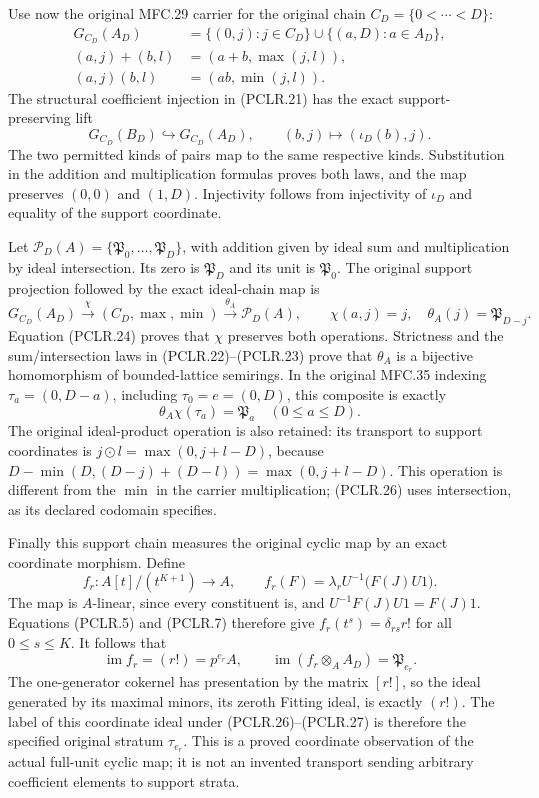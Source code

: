Use now the original MFC.29 carrier for the original chain
\(C_D=\{0<\cdots<D\}\):
\[
 \begin{split}
 G_{C_D}(A_D)&=\{(0,j):j\in C_D\}
                      \cup\{(a,D):a\in A_D\},\\
 (a,j)+(b,l)&=(a+b,\max(j,l)),\\
 (a,j)(b,l)&=(ab,\min(j,l)).
 \end{split}
 \tag{PCLR.24}
\]
The structural coefficient injection in (PCLR.21) has the exact
support-preserving lift
\[
 G_{C_D}(B_D)\hookrightarrow G_{C_D}(A_D),
       \qquad (b,j)\longmapsto(\iota_D(b),j).
 \tag{PCLR.25}
\]
The two permitted kinds of pairs map to the same respective
kinds. Substitution in the addition and multiplication formulas
proves both laws, and the map preserves \((0,0)\) and \((1,D)\).
Injectivity follows from injectivity of \(\iota_D\) and equality
of the support coordinate.

Let \(\mathcal P_D(A)=\{\mathfrak P_0,\ldots,
\mathfrak P_D\}\), with addition given by ideal sum and
multiplication by ideal intersection. Its zero is
\(\mathfrak P_D\) and its unit is \(\mathfrak P_0\). The original
support projection followed by the exact ideal-chain map is
\[
 G_{C_D}(A_D)\xrightarrow{\chi}(C_D,\max,\min)
    \xrightarrow{\theta_A}\mathcal P_D(A),\qquad
 \chi(a,j)=j,\quad\theta_A(j)=\mathfrak P_{D-j}.
 \tag{PCLR.26}
\]
Equation (PCLR.24) proves that \(\chi\) preserves both
operations. Strictness and the sum/intersection laws in
(PCLR.22)--(PCLR.23) prove that \(\theta_A\) is a bijective
homomorphism of bounded-lattice semirings. In the original
MFC.35 indexing \(\tau_a=(0,D-a)\), including
\(\tau_0=e=(0,D)\), this composite is exactly
\[
 \theta_A\chi(\tau_a)=\mathfrak P_a\quad(0\leq a\leq D).
 \tag{PCLR.27}
\]
The original ideal-product operation is also retained: its
transport to support coordinates is
\(j\mathbin{\odot}l=\max(0,j+l-D)\), because
\(D-\min(D,(D-j)+(D-l))=\max(0,j+l-D)\).
This operation is different from the \(\min\) in the carrier
multiplication; (PCLR.26) uses intersection, as its declared
codomain specifies.

Finally this support chain measures the original cyclic map by
an exact coordinate morphism. Define
\[
 f_r:A[t]/(t^{K+1})\longrightarrow A,\qquad
 f_r(F)=\lambda_rU^{-1}\bigl(F(J)U1\bigr).
 \tag{PCLR.28}
\]
The map is \(A\)-linear, since every constituent is, and
\(U^{-1}F(J)U1=F(J)1\). Equations (PCLR.5) and (PCLR.7)
therefore give \(f_r(t^s)=\delta_{rs}r!\) for all
\(0\leq s\leq K\). It follows that
\[
 \operatorname{im}f_r=(r!)=p^{e_r}A,\qquad
 \operatorname{im}(f_r\otimes_A A_D)=\mathfrak P_{e_r}.
 \tag{PCLR.29}
\]
The one-generator cokernel has presentation by the matrix
\([r!]\), so the ideal generated by its maximal minors, its
zeroth Fitting ideal, is exactly \((r!)\). The label of this
coordinate ideal under (PCLR.26)--(PCLR.27) is therefore the
specified original stratum \(\tau_{e_r}\). This is a proved
coordinate observation of the actual full-unit cyclic map;
it is not an invented transport sending arbitrary coefficient
elements to support strata.

